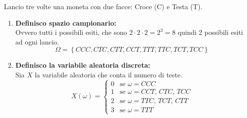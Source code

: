 \documentclass{article}  %
\theoremstyle{definition}
\begin{document}
\begin{esercizio}[Esercizio]
	Lancio tre volte una moneta con due facce: Croce (C) e Testa (T).
	\begin{enumerate}
		\item \textbf{Definisco spazio campionario:} \\
		      Ovvero tutti i possibili esiti, che sono $2 \cdot 2 \cdot 2 = 2^3=8$ quindi 2 possibili esiti ad ogni lancio.
		      \[
			      \Omega= \left\{CCC, CTC, CTT, CCT, TTT, TTC, TCT, TCC \right\}
		      \]
		\item \textbf{Definisco la variabile aleatoria discreta:} \\
		      Sia $X$ la variabile aleatoria che conta il numero di teste.
		      \[
			      X(\omega)=
			      \begin{cases}
				      0 & \text{se } \omega = CCC               \\
				      1 & \text{se } \omega = CCT,\, CTC,\, TCC \\
				      2 & \text{se } \omega = TTC,\, TCT,\, CTT \\
				      3 & \text{se } \omega = TTT
			      \end{cases}
		      \]


\end{enumerate}
\end{esercizio}
\end{document}
